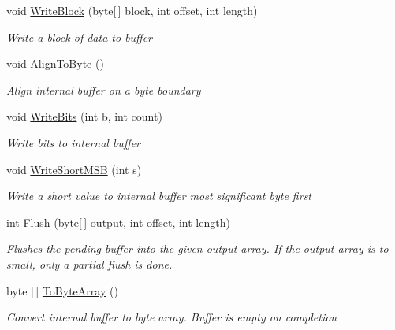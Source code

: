 \begin{DoxyCompactItemize}
void \hyperlink{class_i_c_sharp_code_1_1_sharp_zip_lib_1_1_zip_1_1_compression_1_1_pending_buffer_ae263d7650c03a8cbeb4ba1aa69727da4}{Write\+Block} (byte\mbox{[}$\,$\mbox{]} block, int offset, int length)
\begin{DoxyCompactList}\small\item\em Write a block of data to buffer \end{DoxyCompactList}\item 
void \hyperlink{class_i_c_sharp_code_1_1_sharp_zip_lib_1_1_zip_1_1_compression_1_1_pending_buffer_a27eda8aa6361ec5b0123a1f6e359008f}{Align\+To\+Byte} ()
\begin{DoxyCompactList}\small\item\em Align internal buffer on a byte boundary \end{DoxyCompactList}\item 
void \hyperlink{class_i_c_sharp_code_1_1_sharp_zip_lib_1_1_zip_1_1_compression_1_1_pending_buffer_a64bcba2bec299128150f13ba0afeec76}{Write\+Bits} (int b, int count)
\begin{DoxyCompactList}\small\item\em Write bits to internal buffer \end{DoxyCompactList}\item 
void \hyperlink{class_i_c_sharp_code_1_1_sharp_zip_lib_1_1_zip_1_1_compression_1_1_pending_buffer_acb454c89e12f3795c186255ed5d950ab}{Write\+Short\+M\+SB} (int s)
\begin{DoxyCompactList}\small\item\em Write a short value to internal buffer most significant byte first \end{DoxyCompactList}\item 
int \hyperlink{class_i_c_sharp_code_1_1_sharp_zip_lib_1_1_zip_1_1_compression_1_1_pending_buffer_a11c98151c04ba844b487b76e7b89d2a7}{Flush} (byte\mbox{[}$\,$\mbox{]} output, int offset, int length)
\begin{DoxyCompactList}\small\item\em Flushes the pending buffer into the given output array. If the output array is to small, only a partial flush is done. \end{DoxyCompactList}\item 
byte \mbox{[}$\,$\mbox{]} \hyperlink{class_i_c_sharp_code_1_1_sharp_zip_lib_1_1_zip_1_1_compression_1_1_pending_buffer_af92ff9798b6fad3d99ae1aa2ed9a4e67}{To\+Byte\+Array} ()
\begin{DoxyCompactList}\small\item\em Convert internal buffer to byte array. Buffer is empty on completion \end{DoxyCompactList}\item 

\end{DoxyCompactItemize}
